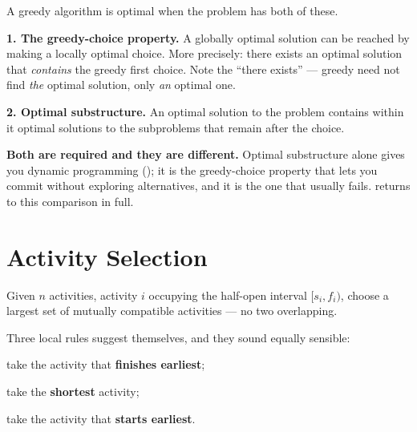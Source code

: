 \begin{conceptbox}
A greedy algorithm is optimal when the problem has both of these.

\smallskip
\textbf{1. The greedy-choice property.} A globally optimal solution can be
reached by making a locally optimal choice. More precisely: there exists an
optimal solution that \emph{contains} the greedy first choice. Note the
``there exists'' --- greedy need not find \emph{the} optimal solution, only
\emph{an} optimal one.

\smallskip
\textbf{2. Optimal substructure.} An optimal solution to the problem contains
within it optimal solutions to the subproblems that remain after the choice.

\smallskip
\textbf{Both are required and they are different.} Optimal substructure alone
gives you dynamic programming (); it is the greedy-choice property
that lets you commit without exploring alternatives, and it is the one that
usually fails.  returns to this comparison in full.
\end{conceptbox}

\section{Activity Selection}

\begin{definitionbox}
Given $n$ activities, activity $i$ occupying the half-open interval
$[s_{i}, f_{i})$, choose a largest set of mutually compatible activities --- no
two overlapping.
\end{definitionbox}

Three local rules suggest themselves, and they sound equally sensible:

\begin{tight}
  \item take the activity that \textbf{finishes earliest};
  \item take the \textbf{shortest} activity;
  \item take the activity that \textbf{starts earliest}.
\end{tight}


